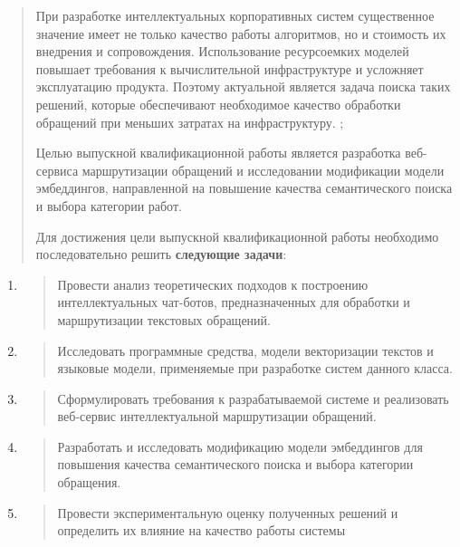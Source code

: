 \documentclass[
]{article}
\begin{document}
\begin{quote}
При разработке интеллектуальных корпоративных систем существенное
значение имеет не только качество работы алгоритмов, но и стоимость их
внедрения и сопровождения. Использование ресурсоемких моделей повышает
требования к вычислительной инфраструктуре и усложняет эксплуатацию
продукта. Поэтому актуальной является задача поиска таких решений,
которые обеспечивают необходимое качество обработки обращений при
меньших затратах на инфраструктуру. ;

Целью выпускной квалификационной работы является разработка веб-сервиса
маршрутизации обращений и исследовании модификации модели эмбеддингов,
направленной на повышение качества семантического поиска и выбора
категории работ.

Для достижения цели выпускной квалификационной работы необходимо
последовательно решить \textbf{следующие задачи}:
\end{quote}

\begin{enumerate}
\def\labelenumi{\arabic{enumi}.}
\item
  \begin{quote}
  Провести анализ теоретических подходов к построению интеллектуальных
  чат-ботов, предназначенных для обработки и маршрутизации текстовых
  обращений.
  \end{quote}
\item
  \begin{quote}
  Исследовать программные средства, модели векторизации текстов и
  языковые модели, применяемые при разработке систем данного класса.
  \end{quote}
\item
  \begin{quote}
  Сформулировать требования к разрабатываемой системе и реализовать
  веб-сервис интеллектуальной маршрутизации обращений.
  \end{quote}
\item
  \begin{quote}
  Разработать и исследовать модификацию модели эмбеддингов для повышения
  качества семантического поиска и выбора категории обращения.
  \end{quote}
\item
  \begin{quote}
  Провести экспериментальную оценку полученных решений и определить их
  влияние на качество работы системы
  \end{quote}
\end{enumerate}
\end{document}
